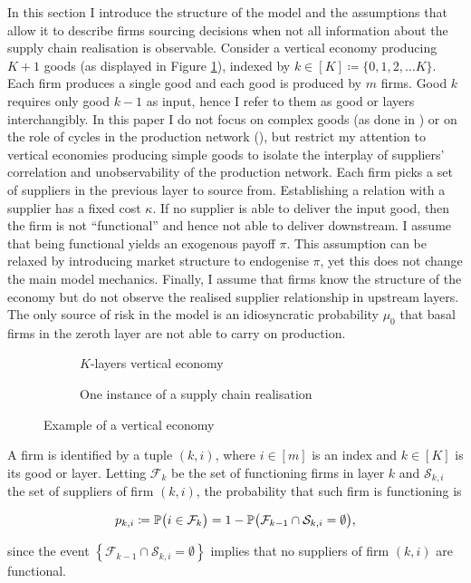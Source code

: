 \documentclass[../../main.tex]{subfiles}
\begin{document}
In this section I introduce the structure of the model and the assumptions that allow it to describe firms sourcing decisions when not all information about the supply chain realisation is observable. Consider a vertical economy producing $K + 1$ goods (as displayed in Figure \ref{fig:vertical-economy-diagram}), indexed by $k \in [K] \coloneqq \{ 0, 1, 2, \ldots K \}$. Each firm produces a single good and each good is produced by $m$ firms. Good $k$ requires only good $k - 1$ as input, hence I  refer to them as good or layers interchangibly. In this paper I do not focus on complex goods (as done in \cite{elliott_supply_2022}) or on the role of cycles in the production network (\cite{acemoglu_network_2012,baqaee_macroeconomic_2019}), but restrict my attention to vertical economies producing simple goods to isolate the interplay of suppliers' correlation and unobservability of the production network. Each firm picks a set of suppliers in the previous layer to source from. Establishing a relation with a supplier has a fixed cost $\kappa$. If no supplier is able to deliver the input good, then the firm is not ``functional'' and hence not able to deliver downstream. I assume that being functional yields an exogenous payoff $\pi$. This assumption can be relaxed by introducing market structure to endogenise $\pi$, yet this does not change the main model mechanics. Finally, I assume that firms know the structure of the economy but do not observe the realised supplier relationship in upstream layers. The only source of risk in the model is an idiosyncratic probability $\mu_0$ that basal firms in the zeroth layer are not able to carry on production.
\begin{figure}[H]
  \centering
  \begin{subfigure}{.5\textwidth}
    \centering
    \caption{$K$-layers vertical economy}
    \label{fig:vertical-economy-diagram}
  \end{subfigure}%
  \begin{subfigure}{.5\textwidth}
    \centering
    \caption{One instance of a supply chain realisation}
    \label{fig:vertical-economy-diagram:suppliers}
  \end{subfigure}
  \caption{Example of a vertical economy}
  \label{fig:gf}
\end{figure}


A firm is identified by a tuple $(k, i)$, where $i \in [m]$ is an index and $k \in [K]$ is its good or layer. Letting $\mathcal{F}_k$ be the set of functioning firms in layer $k$ and $\mathcal{S}_{k, i}$ the set of suppliers of firm $(k, i)$, the probability that such firm is functioning is

\begin{equation} \label{eq:functional_probability}
  p_{k, i} \coloneqq \P\big( i \in \mathcal{F}_k \big) = 1 - \P\big( \mathcal{F}_{k - 1} \cap \mathcal{S}_{k, i} = \emptyset \big),
\end{equation}

since the event $\left\{ \mathcal{F}_{k - 1} \cap \mathcal{S}_{k, i} = \emptyset \right\}$ implies that no suppliers of firm $(k, i)$ are functional.
\end{document}
